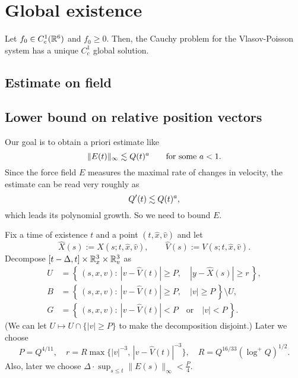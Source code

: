 \documentclass[11pt]{amsart}
\begin{document}
\section{Global existence}



\begin{thm*}[Schaeffer, 1991]
Let $f_0\in C_c^1(\mathbb{R}^6)$ and $f_0\ge0$.
Then, the Cauchy problem for the Vlasov-Poisson system has a unique $C_c^1$ global solution.
\end{thm*}

\subsection{Estimate on field}




\subsection{Lower bound on relative position vectors}
Our goal is to obtain a priori estimate like
\[\|E(t)\|_\infty\lesssim Q(t)^a\qquad\text{for some }a<1.\]
Since the force field $E$ measures the maximal rate of changes in velocity, the estimate can be read very roughly as
\[Q'(t)\lesssim Q(t)^a,\]
which leads its polynomial growth.
So we need to bound $E$.

Fix a time of existence $t$ and a point $(t,\hat x,\hat v)$ and let
\[\hat X(s):=X(s;t,\hat x,\hat v),\qquad\hat V(s):=V(s;t,\hat x,\hat v).\]
Decompose $[t-\Delta,t]\times\mathbb{R}_x^3\times\mathbb{R}_v^3$ as
\begin{align*}
U&=\left\{\,(s,x,v):\ |v-\hat V(t)|\ge P,\quad|y-\hat X(s)|\ge r\,\right\},\\
B&=\left\{\,(s,x,v):\ |v-\hat V(t)|\ge P,\quad|v|\ge P\,\right\}\setminus U,\\
G&=\left\{\,(s,x,v):\ |v-\hat V(t)|<P\quad\text{or}\quad|v|<P\,\right\}.
\end{align*}
(We can let $U\mapsto U\cap\{|v|\ge P\}$ to make the decomposition disjoint.)
Later we choose
\[P=Q^{4/11},\quad r=R\max\{|v|^{-3},\,|v-\hat V(t)|^{-3}\},\quad R=Q^{16/33}(\log^+Q)^{1/2}.\]
Also, later we choose $\Delta\cdot\sup_{s\le t}\|E(s)\|_\infty<\frac P4$.
\end{document}

